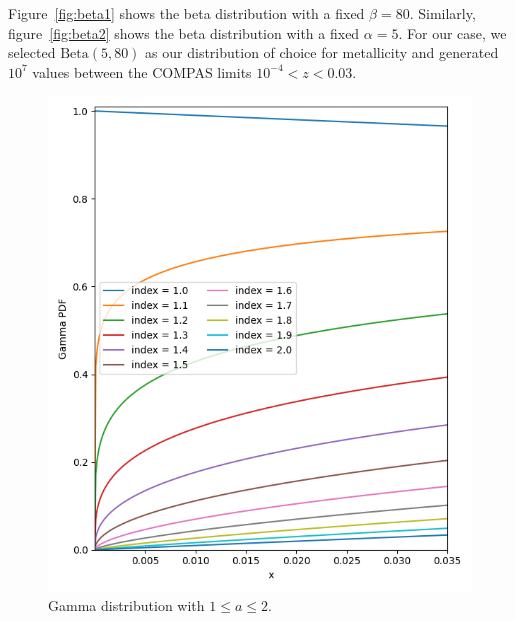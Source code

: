 Figure~\ref{fig:beta1} shows the beta distribution with a fixed $\beta=80$.
Similarly, figure~\ref{fig:beta2} shows the beta distribution with a fixed $\alpha=5$.
For our case, we selected $\text{Beta}(5, 80)$ as our distribution of choice for metallicity and generated $10^7$ values between the COMPAS limits $10^{-4} < z < 0.03$.

\begin{figure}[!ht]%
    \centering
    \includegraphics[width=\linewidth]{images/gamma}
    \caption{Gamma distribution with $1 \leq a \leq 2$.}
    \label{fig:gamma_distribution}
\end{figure}%

